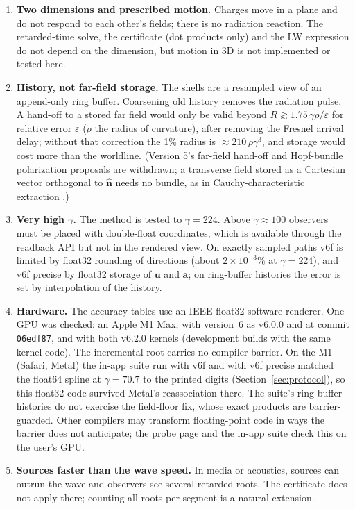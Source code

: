 \documentclass[11pt, a4paper]{article}
\begin{document}
\begin{enumerate}
    \item \textbf{Two dimensions and prescribed motion.} Charges move in a plane and do not respond to each other's fields; there is no radiation reaction. The retarded-time solve, the certificate (dot products only) and the LW expression do not depend on the dimension, but motion in 3D is not implemented or tested here.
    \item \textbf{History, not far-field storage.} The shells are a resampled view of an append-only ring buffer. Coarsening old history removes the radiation pulse. A hand-off to a stored far field would only be valid beyond $R \gtrsim 1.75\,\gamma\rho/\varepsilon$ for relative error $\varepsilon$ ($\rho$ the radius of curvature), after removing the Fresnel arrival delay; without that correction the 1\% radius is $\approx 210\,\rho\gamma^3$, and storage would cost more than the worldline. (Version 5's far-field hand-off and Hopf-bundle polarization proposals are withdrawn; a transverse field stored as a Cartesian vector orthogonal to $\hat{\mathbf{n}}$ needs no bundle, as in Cauchy-characteristic extraction \cite{bishop1997}.)
    \item \textbf{Very high $\gamma$.} The method is tested to $\gamma = 224$. Above $\gamma \approx 100$ observers must be placed with double-float coordinates, which is available through the readback API but not in the rendered view. On exactly sampled paths v6f is limited by float32 rounding of directions (about $2\times10^{-3}\%$ at $\gamma = 224$), and v6f precise by float32 storage of $\mathbf{u}$ and $\mathbf{a}$; on ring-buffer histories the error is set by interpolation of the history.
    \item \textbf{Hardware.} The accuracy tables use an IEEE float32 software renderer. One GPU was checked: an Apple M1 Max, with version~6 as v6.0.0 and at commit \texttt{06edf87}, and with both v6.2.0 kernels (development builds with the same kernel code). The incremental root carries no compiler barrier. On the M1 (Safari, Metal) the in-app suite run with v6f and with v6f precise matched the float64 spline at $\gamma = 70.7$ to the printed digits (Section~\ref{sec:protocol}), so this float32 code survived Metal's reassociation there. The suite's ring-buffer histories do not exercise the field-floor fix, whose exact products are barrier-guarded. Other compilers may transform floating-point code in ways the barrier does not anticipate; the probe page and the in-app suite check this on the user's GPU.
    \item \textbf{Sources faster than the wave speed.} In media or acoustics, sources can outrun the wave and observers see several retarded roots. The certificate does not apply there; counting all roots per segment is a natural extension.
\end{enumerate}
\end{document}
